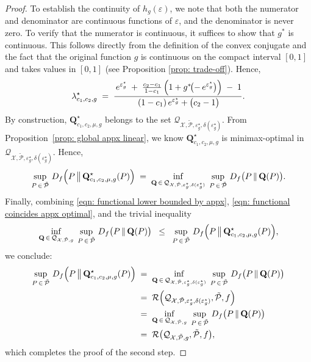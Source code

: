 \documentclass[accepted]{article}
\theoremstyle{plain} %
\theoremstyle{definition}
\theoremstyle{remark}
\newcommand{\bQ}{\mathbf{Q}}
\begin{document}
\begin{proof}
To establish the continuity of $h_g(\varepsilon)$, we note that both the numerator and denominator are continuous functions of $\varepsilon$, and the denominator is never zero. To verify that the numerator is continuous, it suffices to show that $g^*$ is continuous. This follows directly from the definition of the convex conjugate and the fact that the original function $g$ is continuous on the compact interval $[0,1]$ and takes values in $[0,1]$ (see Proposition \ref{prop: trade-off}). Hence,
\[
\lambda^\star_{c_1,c_2,g}
\;=\;
\frac{\,e^{\varepsilon^\star_g} \;+\; \tfrac{c_2 - c_1}{1 - c_1}\,\Bigl(1 + g^*\!\bigl(-\,e^{\varepsilon^\star_g}\bigr)\Bigr) \;-\; 1}
     {\,(1 - c_1)\,e^{\varepsilon^\star_g} + \bigl(c_2 - 1\bigr)}.
\]
By construction, $\bQ^\star_{c_1,c_2,\mu,g}$ belongs to the set 
\(\mathcal{Q}_{\mathcal{X}, \tilde{\mathcal{P}}, \varepsilon^\star_g, \delta(\varepsilon^\star_g)}\).  
From Proposition~\ref{prop: global appx linear}, we know $\bQ^\star_{c_1,c_2,\mu,g}$ is minimax-optimal in 
\(\mathcal{Q}_{\mathcal{X}, \tilde{\mathcal{P}}, \varepsilon^\star_g, \delta(\varepsilon^\star_g)}\).  
Hence,
\begin{equation}\label{eqn: functional coincides appx optimal}
    \sup_{P \,\in\, \tilde{\mathcal{P}}}
    \,D_f\Bigl(P \,\bigl\|\, \bQ^\star_{c_1,c_2,\mu,g}(P)\Bigr)
    \;=\;
    \inf_{\bQ \,\in\, \mathcal{Q}_{\mathcal{X}, \tilde{\mathcal{P}}, \varepsilon^\star_g, \delta(\varepsilon^\star_g)}}
    \;\sup_{P \,\in\, \tilde{\mathcal{P}}}
    \,D_f\bigl(P \,\|\, \bQ(P)\bigr).
\end{equation}
Finally, combining \eqref{eqn: functional lower bounded by appx}, \eqref{eqn: functional coincides appx optimal}, and the trivial inequality 
\[
\inf_{\bQ \,\in\, \mathcal{Q}_{\mathcal{X}, \tilde{\mathcal{P}}, g}}
\;\sup_{P \,\in\, \tilde{\mathcal{P}}}
\,D_f\bigl(P \,\|\, \bQ(P)\bigr)
\;\;\le\;\;
\sup_{P \,\in\, \tilde{\mathcal{P}}}
\,D_f\Bigl(P \,\bigl\|\, \bQ^\star_{c_1,c_2,\mu,g}(P)\Bigr),
\]
we conclude:
\begin{align*}
    \sup_{P \,\in\, \tilde{\mathcal{P}}}
\,D_f\Bigl(P \,\bigl\|\, \bQ^\star_{c_1,c_2,\mu,g}(P)\Bigr) &\;=\;
    \inf_{\bQ \,\in\, \mathcal{Q}_{\mathcal{X}, \tilde{\mathcal{P}}, \varepsilon^\star_g, \delta(\varepsilon^\star_g)}}
    \;\sup_{P \,\in\, \tilde{\mathcal{P}}}
    \,D_f\bigl(P \,\|\, \bQ(P)\bigr) 
\\ & \;=\;
    \mathcal{R}\Bigl(\mathcal{Q}_{\mathcal{X}, \tilde{\mathcal{P}}, \varepsilon^\star_g, \delta(\varepsilon^\star_g)}, 
                    \tilde{\mathcal{P}}, f\Bigr)
                      \\
    & \;=\; \inf_{\bQ \,\in\, \mathcal{Q}_{\mathcal{X}, \tilde{\mathcal{P}}, g}}
    \;\sup_{P \,\in\, \tilde{\mathcal{P}}}
    \,D_f\bigl(P \,\|\, \bQ(P)\bigr) \\
    & \;=\; \mathcal{R}\big(\mathcal{Q}_{\mathcal{X}, \tilde{\mathcal{P}}, g}, \tilde{\mathcal{P}}, f\big),
\end{align*}
which completes the proof of the second step.


\end{proof}
\end{document}
